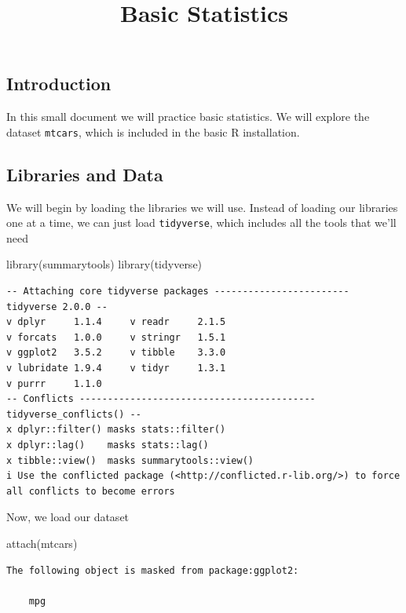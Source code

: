 \documentclass[
  letterpaper,
  DIV=11,
  numbers=noendperiod]{scrartcl}
\title{Basic Statistics}
\author{}
\date{}
\newenvironment{Shaded}{\begin{snugshade}}{\end{snugshade}}
\newcommand{\FunctionTok}[1]{\textcolor[rgb]{0.28,0.35,0.67}{#1}}
\newcommand{\NormalTok}[1]{\textcolor[rgb]{0.00,0.23,0.31}{#1}}
\begin{document}
\maketitle


\subsection{Introduction}\label{introduction}

In this small document we will practice basic statistics. We will
explore the dataset \texttt{mtcars}, which is included in the basic R
installation.

\subsection{Libraries and Data}\label{libraries-and-data}

We will begin by loading the libraries we will use. Instead of loading
our libraries one at a time, we can just load \texttt{tidyverse}, which
includes all the tools that we'll need

\begin{Shaded}
\begin{Highlighting}[]
\FunctionTok{library}\NormalTok{(summarytools)}
\FunctionTok{library}\NormalTok{(tidyverse)}
\end{Highlighting}
\end{Shaded}

\begin{verbatim}
-- Attaching core tidyverse packages ------------------------ tidyverse 2.0.0 --
v dplyr     1.1.4     v readr     2.1.5
v forcats   1.0.0     v stringr   1.5.1
v ggplot2   3.5.2     v tibble    3.3.0
v lubridate 1.9.4     v tidyr     1.3.1
v purrr     1.1.0     
-- Conflicts ------------------------------------------ tidyverse_conflicts() --
x dplyr::filter() masks stats::filter()
x dplyr::lag()    masks stats::lag()
x tibble::view()  masks summarytools::view()
i Use the conflicted package (<http://conflicted.r-lib.org/>) to force all conflicts to become errors
\end{verbatim}

Now, we load our dataset

\begin{Shaded}
\begin{Highlighting}[]
\FunctionTok{attach}\NormalTok{(mtcars)}
\end{Highlighting}
\end{Shaded}

\begin{verbatim}
The following object is masked from package:ggplot2:

    mpg
\end{verbatim}
\end{document}
